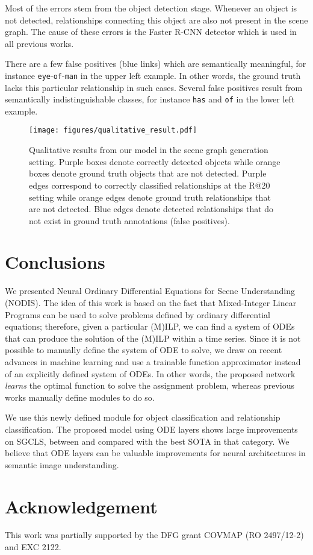 \documentclass[runningheads]{llncs}
\begin{document}
Most of the errors stem from the object detection stage. Whenever an object is not detected, relationships connecting this object are also not present in the scene graph. The cause of these errors is the Faster R-CNN detector which is used in all previous works. 

There are a few false positives (blue links) which are semantically meaningful, for instance \texttt{eye}-\texttt{of}-\texttt{man} in the upper left example. In other words, the ground truth lacks this particular relationship in such cases. Several false positives result from semantically indistinguishable classes, for instance \texttt{has} and \texttt{of} in the lower left example. 

\begin{figure*}[!ht]
\centering
    \texttt{[image: figures/qualitative\_result.pdf]}
    \caption{Qualitative results from our model in the scene graph generation setting. 
    Purple boxes denote correctly detected objects while orange boxes denote ground truth objects that are not detected.
    Purple edges correspond to correctly classified relationships at the R@20 setting while orange edges denote ground truth relationships that are not detected. Blue edges denote detected relationships that do not exist in ground truth annotations (false positives).
}
    \label{fig:qualitative}
\end{figure*}


\section{Conclusions} 
\label{Sec:Concs}



We presented Neural Ordinary Differential Equations for Scene Understanding (NODIS). The idea of this work is based on the fact that Mixed-Integer Linear Programs can be used to solve problems defined by ordinary differential equations; therefore, given a particular (M)ILP, we can find a system of ODEs that can produce the solution of the (M)ILP within a time series. Since it is not possible to manually define the system of ODE to solve, we draw on recent advances in machine learning and use a trainable function approximator instead of an explicitly defined system of ODEs. 
In other words, the proposed network \emph{learns} the optimal function to solve the assignment problem, whereas previous works manually define modules to do so.

We use this newly defined module for object classification and relationship classification. 
The proposed model using ODE layers shows large improvements on SGCLS, between  and  compared with the best SOTA in that category. We believe that ODE layers can be valuable improvements for neural architectures in semantic image understanding. 
\section*{Acknowledgement}
This work was partially supported by the DFG grant COVMAP (RO 2497/12-2) and EXC 2122.



\clearpage


\end{document}
